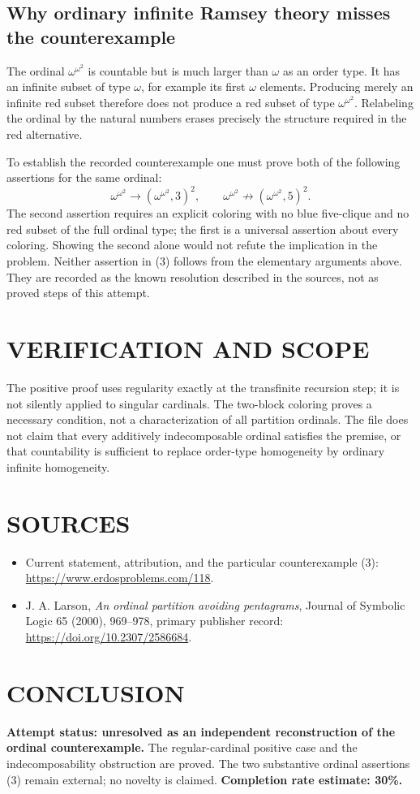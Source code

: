 \subsection{Why ordinary infinite Ramsey theory misses the counterexample}
The ordinal $\omega^{\omega^2}$ is countable but is much larger than $\omega$ as an order type. It has an infinite subset of type $\omega$, for example its first $\omega$ elements. Producing merely an infinite red subset therefore does not produce a red subset of type $\omega^{\omega^2}$. Relabeling the ordinal by the natural numbers erases precisely the structure required in the red alternative.

To establish the recorded counterexample one must prove both of the following assertions for the same ordinal:
\[
\omega^{\omega^2}\to(\omega^{\omega^2},3)^2,
\qquad
\omega^{\omega^2}\not\to(\omega^{\omega^2},5)^2.
\tag{3}
\]
The second assertion requires an explicit coloring with no blue five-clique and no red subset of the full ordinal type; the first is a universal assertion about every coloring. Showing the second alone would not refute the implication in the problem. Neither assertion in (3) follows from the elementary arguments above. They are recorded as the known resolution described in the sources, not as proved steps of this attempt.

\section{VERIFICATION AND SCOPE}
The positive proof uses regularity exactly at the transfinite recursion step; it is not silently applied to singular cardinals. The two-block coloring proves a necessary condition, not a characterization of all partition ordinals. The file does not claim that every additively indecomposable ordinal satisfies the premise, or that countability is sufficient to replace order-type homogeneity by ordinary infinite homogeneity.

\section{SOURCES}
\begin{itemize}
\item Current statement, attribution, and the particular counterexample (3): \url{https://www.erdosproblems.com/118}.
\item J. A. Larson, \emph{An ordinal partition avoiding pentagrams}, Journal of Symbolic Logic 65 (2000), 969--978, primary publisher record: \url{https://doi.org/10.2307/2586684}.
\end{itemize}

\section{CONCLUSION}
\textbf{Attempt status: unresolved as an independent reconstruction of the ordinal counterexample.} The regular-cardinal positive case and the indecomposability obstruction are proved. The two substantive ordinal assertions (3) remain external; no novelty is claimed.
\textbf{Completion rate estimate: 30\%.}
